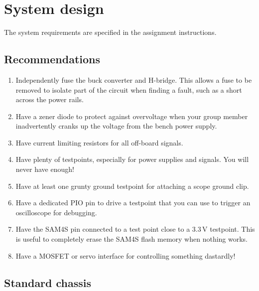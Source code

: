 \chapter{System design}
\label{hardware}

The system requirements are specified in the assignment instructions.


\section{Recommendations}\label{recommendations}

\begin{enumerate}
\item
  Independently fuse the buck converter and H-bridge. This allows a fuse
  to be removed to isolate part of the circuit when finding a fault,
  such as a short across the power rails.

\item
  Have a zener diode to protect against overvoltage when your group
  member inadvertently cranks up the voltage from the bench power
  supply.

\item
  Have current limiting resistors for all off-board signals.

\item
  Have plenty of testpoints, especially for power supplies and
  signals.  You will never have enough!

\item
  Have at least one grunty ground testpoint for attaching a scope ground
  clip.

\item
  Have a dedicated PIO pin to drive a testpoint that you can use to
  trigger an oscilloscope for debugging.

\item
  Have the SAM4S  pin connected to a test point close to a 3.3\,V
  testpoint. This is useful to completely erase the SAM4S flash memory
  when nothing works.

\item
  Have a MOSFET or servo interface for controlling something dastardly!

\end{enumerate}


\section{Standard chassis}

